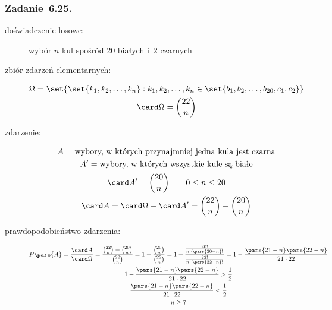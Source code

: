 \subsubsection{Zadanie~6.25.}
\begin{description}
    \item[doświadczenie losowe:] wybór \(n\) kul spośród \(20\) białych i~\(2\) czarnych
    \item[zbiór zdarzeń elementarnych:]
        \begin{gather*}
            \Omega = \set{\set{k_1, k_2, \ldots, k_n} : k_1, k_2, \ldots, k_n \in \set{b_1, b_2, \ldots, b_{20}, c_1, c_2}}\\
            \card\Omega = \binom{22}{n}
        \end{gather*}
    \item[zdarzenie:]
        \begin{gather*}
            A = \text{wybory, w~których przynajmniej jedna kula jest czarna}\\
            A' = \text{wybory, w~których wszystkie kule są białe}\\
            \card A' = \binom{20}{n} \qquad 0 \leq n \leq 20\\
            \card A
                = \card\Omega - \card A'
                = \binom{22}{n} - \binom{20}{n}
        \end{gather*}
    \item[prawdopodobieństwo zdarzenia:]
        \begin{gather*}
            P\pars{A}
                = \frac{\card A}{\card\Omega}
                = \frac{\binom{22}{n} - \binom{20}{n}}{\binom{22}{n}}
                = 1 - \frac{\binom{20}{n}}{\binom{22}{n}}
                = 1 - \frac{\frac{20!}{n! \cdot \pars{20 - n}!}}{\frac{22!}{n! \cdot \pars{22 - n}!}}
                = 1 - \frac{\pars{21 - n}\pars{22 - n}}{21 \cdot 22}\\
            1 - \frac{\pars{21 - n}\pars{22 - n}}{21 \cdot 22} > \frac{1}{2}\\
            \frac{\pars{21 - n}\pars{22 - n}}{21 \cdot 22} < \frac{1}{2}\\
            n \geq 7
        \end{gather*}
\end{description}
